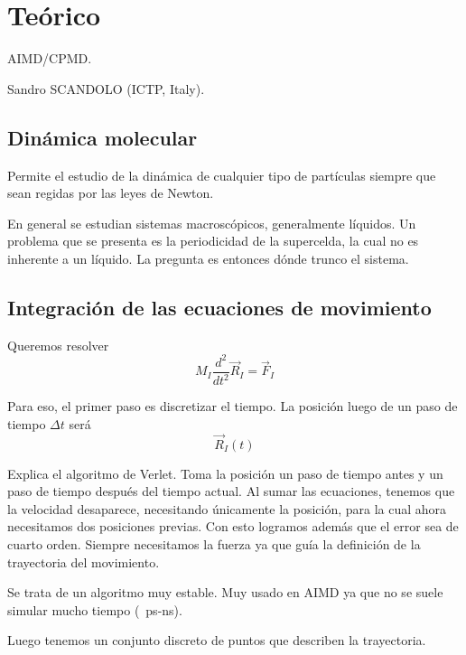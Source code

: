 \section{Teórico}

   AIMD/CPMD.

  	Sandro SCANDOLO (ICTP, Italy).

\subsection{Dinámica molecular}

  Permite el estudio de la dinámica de cualquier tipo de partículas siempre que sean regidas por las leyes de Newton.

  En general se estudian sistemas macroscópicos, generalmente líquidos. Un problema que se presenta es la periodicidad de la supercelda, la cual no es inherente a un líquido. La pregunta es entonces dónde trunco el sistema.


\subsection{Integración de las ecuaciones de movimiento}

  Queremos resolver
    $$M_I \frac{d^2}{dt^2} \vec{R}_I = \vec{F}_I$$

  Para eso, el primer paso es discretizar el tiempo. La posición luego de un paso de tiempo $\Delta t$ será
    $$\vec{R}_I (t)$$

  Explica el algoritmo de Verlet. Toma la posición un paso de tiempo antes y un paso de tiempo después del tiempo actual. Al sumar las ecuaciones, tenemos que la velocidad desaparece, necesitando únicamente la posición, para la cual ahora necesitamos dos posiciones previas. Con esto logramos además que el error sea de cuarto orden. Siempre necesitamos la fuerza ya que guía la definición de la trayectoria del movimiento.


  Se trata de un algoritmo muy estable. Muy usado en AIMD ya que no se suele simular mucho tiempo (~ps-ns).

  Luego tenemos un conjunto discreto de puntos que describen la trayectoria.

